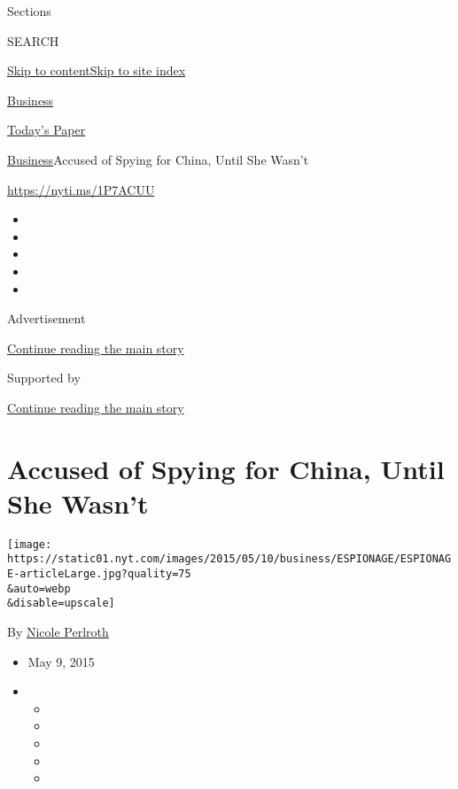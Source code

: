 Sections

SEARCH

\protect\hyperlink{site-content}{Skip to
content}\protect\hyperlink{site-index}{Skip to site index}

\href{https://www.nytimes.com/section/business}{Business}

\href{https://myaccount.nytimes.com/auth/login?response_type=cookie\&client_id=vi}{}

\href{https://www.nytimes.com/section/todayspaper}{Today's Paper}

\href{/section/business}{Business}\textbar{}Accused of Spying for China,
Until She Wasn't

\url{https://nyti.ms/1P7ACUU}

\begin{itemize}
\item
\item
\item
\item
\item
\end{itemize}

Advertisement

\protect\hyperlink{after-top}{Continue reading the main story}

Supported by

\protect\hyperlink{after-sponsor}{Continue reading the main story}

\hypertarget{accused-of-spying-for-china-until-she-wasnt}{%
\section{Accused of Spying for China, Until She
Wasn't}\label{accused-of-spying-for-china-until-she-wasnt}}

\texttt{[image: https://static01.nyt.com/images/2015/05/10/business/ESPIONAGE/ESPIONAGE-articleLarge.jpg?quality=75\\\&auto=webp\\\&disable=upscale]}

By \href{http://www.nytimes.com/by/nicole-perlroth}{Nicole Perlroth}

\begin{itemize}
\item
  May 9, 2015
\item
  \begin{itemize}
  \item
  \item
  \item
  \item
  \item
  \end{itemize}
\end{itemize}

